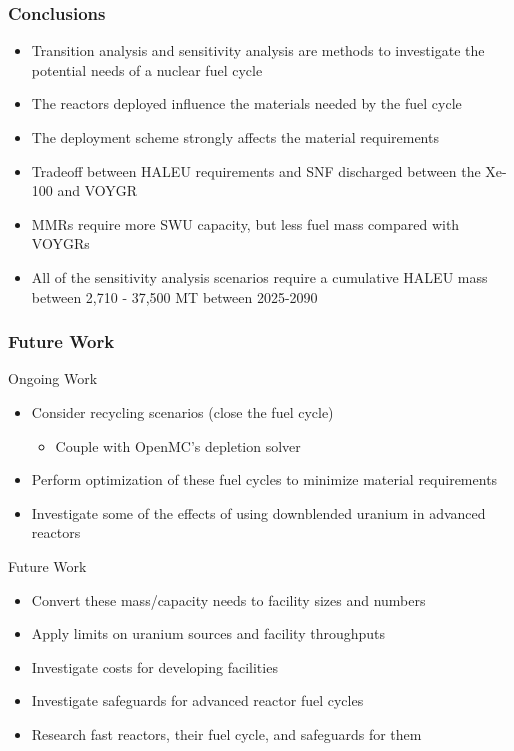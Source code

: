 \begin{frame}
      \frametitle{Conclusions}
      \begin{itemize}
        \item Transition analysis and sensitivity analysis are methods
              to investigate the potential needs of a nuclear fuel cycle
        \item<2-> The reactors deployed influence the materials needed by 
              the fuel cycle
        \item<2-> The deployment scheme strongly affects the material requirements
        \item<3-> Tradeoff between \gls{HALEU} requirements and \gls{SNF} 
              discharged between the Xe-100 and VOYGR
        \item<3-> \glspl{MMR} require more \gls{SWU} capacity, but less fuel mass
              compared with VOYGRs          
        \item<4-> All of the sensitivity analysis scenarios require a cumulative 
              \gls{HALEU} mass between 2,710 - 37,500 MT between 2025-2090       
      \end{itemize}
\end{frame}

\begin{frame}
  \frametitle{Future Work}
  \begin{block}{Ongoing Work}
    
  \begin{itemize}
    \item Consider recycling scenarios (close the fuel cycle)
    \begin{itemize}
      \item Couple \Cyclus with OpenMC's depletion solver
    \end{itemize}
    \item Perform optimization of these fuel cycles to minimize material
          requirements
    \item Investigate some of the effects of using downblended uranium 
          in advanced reactors
  \end{itemize}
  \end{block}

  \pause
  \begin{block}{Future Work}
    \begin{itemize}
      \item Convert these mass/capacity needs to facility sizes and numbers
      \item Apply limits on uranium sources and facility throughputs
      \item Investigate costs for developing facilities      
      \item<1-> Investigate safeguards for advanced reactor fuel cycles
      \item<1-> Research fast reactors, their fuel cycle, and safeguards for them
    \end{itemize}
  \end{block}
\end{frame}